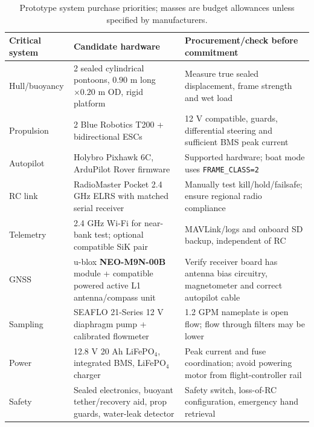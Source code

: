 \documentclass[10pt,a4paper]{article}
\begin{document}
\begin{table}[H]\centering\scriptsize
\caption{Prototype system purchase priorities; masses are budget allowances unless specified by manufacturers.}
\begin{tabularx}{\linewidth}{@{}L{2.3cm}L{3.1cm}Y@{}}\toprule
Critical system & Candidate hardware & Procurement/check before commitment\\\midrule
Hull/buoyancy & 2 sealed cylindrical pontoons, $0.90$ m long $\times0.20$ m OD, rigid platform & Measure true sealed displacement, frame strength and wet load\\
Propulsion & 2 Blue Robotics T200 + bidirectional ESCs & 12 V compatible, guards, differential steering and sufficient BMS peak current \cite{T200}\\
Autopilot & Holybro Pixhawk 6C, ArduPilot Rover firmware & Supported hardware; boat mode uses \texttt{FRAME\_CLASS=2} \cite{Pixhawk6C,ArduBoat}\\
RC link & RadioMaster Pocket 2.4 GHz ELRS with matched serial receiver & Manually test kill/hold/failsafe; ensure regional radio compliance \cite{RadioMaster}\\
Telemetry & 2.4 GHz Wi-Fi for near-bank test; optional compatible SiK pair & MAVLink/logs and onboard SD backup, independent of RC \cite{SiK}\\
GNSS & u-blox \textbf{NEO-M9N-00B} module + compatible powered active L1 antenna/compass unit & Verify receiver board has antenna bias circuitry, magnetometer and correct autopilot cable \cite{M9N,SparkM9N}\\
Sampling & SEAFLO 21-Series 12 V diaphragm pump + calibrated flowmeter & 1.2 GPM nameplate is open flow; flow through filters may be lower \cite{Seaflo21}\\
Power & 12.8 V 20 Ah LiFePO$_4$, integrated BMS, LiFePO$_4$ charger & Peak current and fuse coordination; avoid powering motor from flight-controller rail \cite{Bioenno,PM02D}\\
Safety & Sealed electronics, buoyant tether/recovery aid, prop guards, water-leak detector & Safety switch, loss-of-RC configuration, emergency hand retrieval\\\bottomrule\end{tabularx}\end{table}
\end{document}
